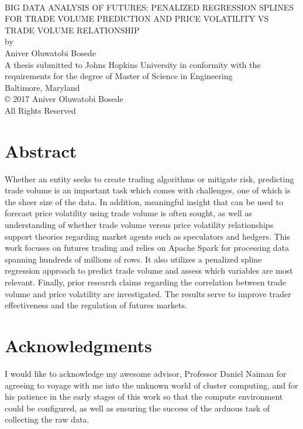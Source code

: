 \documentclass[12pt]{article}
\begin{document}
\

\begin{center}
	\uppercase {Big data analysis of futures: Penalized Regression Splines for trade Volume Prediction and Price Volatility vs trade volume relationship}\\
	\vspace{1in}
	by\\
	Aniver Oluwatobi Bosede\\
	\vspace{1.5in}
	A thesis submitted to Johns Hopkins University in conformity with the requirements for the degree of Master of Science in Engineering\\
	\vspace{.5in}
	Baltimore, Maryland\\
	\vspace{2in}
	\copyright{} 2017 Aniver Oluwatobi Bosede\\
	All Rights Reserved
\end{center}
\newpage
{}
\setcounter{page}{2}

\section*{Abstract}
Whether an entity seeks to create trading algorithms or mitigate risk, predicting trade volume is an important task which comes with challenges, one of which is the sheer size of the data. In addition, meaningful insight that can be used to forecast price volatility using trade volume is often sought, as well as understanding of whether trade volume versus price volatility relationships support theories regarding market agents such as speculators and hedgers. This work focuses on futures trading and relies on Apache Spark for processing data spanning hundreds of millions of rows. It also utilizes a penalized spline regression approach to predict trade volume and assess which variables are most relevant. Finally, prior research claims regarding the correlation between trade volume and price volatility are investigated. The results serve to improve trader effectiveness and the regulation of futures markets.
\newpage

\section*{Acknowledgments}
I would like to acknowledge my awesome advisor, Professor Daniel Naiman for agreeing to voyage with me into the unknown world of cluster computing, and for his patience in the early stages of this work so that the compute environment could be configured, as well as ensuring the success of the arduous task of collecting the raw data.
\end{document}
